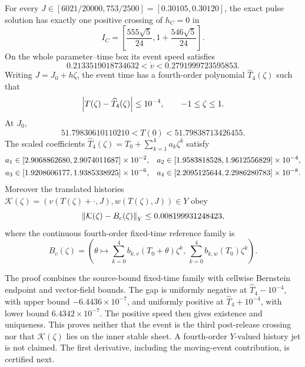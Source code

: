 \begin{theorem}\label{thm:route-c-event}
For every
\(J\in[6021/20000,753/2500]=[0.30105,0.30120]\), the exact pulse solution
has exactly one positive crossing of \(h_C=0\) in
\begin{equation}
 I_C=\left[\frac{555\sqrt5}{24},
               1+\frac{546\sqrt5}{24}\right].         \label{eq:route-c-bracket}
\end{equation}
On the whole parameter--time box its event speed satisfies
\begin{equation}
 0.2133519018734632<\dot v<0.2791999723595853.          \label{eq:route-c-speed}
\end{equation}
Writing \(J=J_0+h\zeta\), the event time has a fourth-order polynomial
\(\widehat T_4(\zeta)\) such that
\begin{equation}
 \left\lvert T(\zeta)-\widehat T_4(\zeta)\right\rvert\le10^{-4},
 \qquad -1\le\zeta\le1.                              \label{eq:event-time-tube}
\end{equation}
At \(J_0\),
\begin{equation}
 51.79830610110210<T(0)<51.79838713426455.             \label{eq:center-event-time}
\end{equation}
The scaled coefficients
\(\widehat T_4(\zeta)=T_0+\sum_{k=1}^4a_k\zeta^k\) satisfy
\begin{align}
 a_1&\in[2.9068862680,2.9074011687]\times10^{-2},&
 a_2&\in[1.9583818528,1.9612556829]\times10^{-4},\notag\\
 a_3&\in[1.9208606177,1.9385338925]\times10^{-6},&
 a_4&\in[2.2095125644,2.2986280783]\times10^{-8}.       \label{eq:event-time-coefficients}
\end{align}
Moreover the translated histories
\(\mathcal K(\zeta)=(v(T(\zeta)+\cdot,J),w(T(\zeta),J))\in Y\) obey
\begin{equation}
 \left\lVert\mathcal K(\zeta)-B_c(\zeta)\right\rVert_Y
 \le0.008199931248423,                                 \label{eq:event-history-tube}
\end{equation}
where the continuous fourth-order fixed-time reference family is
\[
 B_c(\zeta)=
 \left(\theta\longmapsto\sum_{k=0}^4b_{k,v}(T_0+\theta)\zeta^k,\,
                   \sum_{k=0}^4b_{k,w}(T_0)\zeta^k\right).
\]
\end{theorem}

The proof combines the source-bound fixed-time family with cellwise
Bernstein endpoint and vector-field bounds.  The gap is uniformly negative
at \(\widehat T_4-10^{-4}\), with upper bound
\(-6.4436\times10^{-7}\), and uniformly positive at
\(\widehat T_4+10^{-4}\), with lower bound
\(6.4342\times10^{-7}\).  The positive speed then gives existence and
uniqueness.  This proves neither that the event is the third post-release
crossing nor that \(\mathcal K(\zeta)\) lies on the inner stable sheet.  A
fourth-order \(Y\)-valued history jet is not claimed.  The first derivative,
including the moving-event contribution, is certified next.

